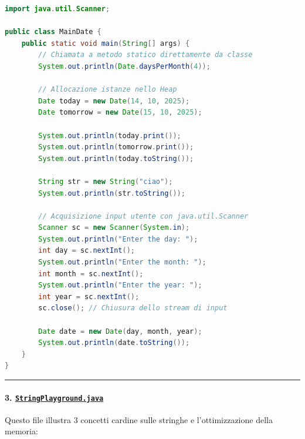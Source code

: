 \documentclass[11pt,a4paper]{article}
\begin{document}
\begin{lstlisting}[language=Java]
import java.util.Scanner;

public class MainDate {
    public static void main(String[] args) {
        // Chiamata a metodo statico direttamente da classe
        System.out.println(Date.daysPerMonth(4));

        // Allocazione istanze nello Heap
        Date today = new Date(14, 10, 2025);
        Date tomorrow = new Date(15, 10, 2025);

        System.out.println(today.print());
        System.out.println(tomorrow.print());
        System.out.println(today.toString());

        String str = new String("ciao");
        System.out.println(str.toString());

        // Acquisizione input utente con java.util.Scanner
        Scanner sc = new Scanner(System.in);
        System.out.println("Enter the day: ");
        int day = sc.nextInt();
        System.out.println("Enter the month: ");
        int month = sc.nextInt();
        System.out.println("Enter the year: ");
        int year = sc.nextInt();
        sc.close(); // Chiusura dello stream di input

        Date date = new Date(day, month, year);
        System.out.println(date.toString());
    }
}
\end{lstlisting}

\begin{center}\rule{0.5\linewidth}{0.5pt}\end{center}

\paragraph{\texorpdfstring{3.
\href{file:///home/wally/Documenti/GitHub/Programmazione-II/25-26/Teoria-e-Esercitazioni/Codice-20260902/Lezioni05-06/StringPlayground.java}{\texttt{StringPlayground.java}}}{3. StringPlayground.java}}\label{stringplayground.java}

Questo file illustra 3 concetti cardine sulle stringhe e
l'ottimizzazione della memoria:
\end{document}

